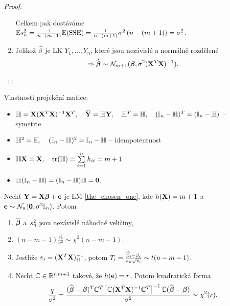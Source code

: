 \begin{proof}
\begin{enumerate}
Celkem pak dostáváme $\mathbb{E} s_n^2 = \frac{1}{n - (m + 1)} \mathbb{E} (\mathrm{SSE}) = \frac{1}{n - (m + 1)} \sigma^2\left(n - (m + 1)\right) = \sigma^2$.

\item
 Jelikož $\widehat{\beta}$ je LK $Y_1,\dots, Y_n$, které jsou nezávislé a normálně rozdělené $$\Rightarrow \widehat{\boldsymbol{\beta}} \sim \mathcal{N}_{m+1} (\boldsymbol{\beta}, \sigma^2(\mathbf{X}^T \mathbf{X})^{-1}).$$
\end{enumerate}
\end{proof}

\begin{remark}
	Vlastnosti projekční matice:
	\begin{itemize}
		\item $\mathbb{H} = \mathbf{X} (\mathbf{X}^T \mathbf{X})^{-1} \mathbf{X}^T, \quad \widehat{\mathbf{Y}} = \mathbb{H} \mathbf{Y}, \quad \mathbb{H}^T = \mathbb{H}, \quad (\mathbb{I}_{n} - \mathbb{H})^T = (\mathbb{I}_{n} - \mathbb{H})$ -- symetrie
		\item $\mathbb{H}^2 = \mathbb{H}, \quad (\mathbb{I}_{n} - \mathbb{H})^2 = \mathbb{I}_{n} - \mathbb{H}$ -- idempotentnost
		\item $\mathbb{H} \mathbf{X} = \mathbf{X}, \quad \mathrm{tr}(\mathbb{H}) = \sum\limits_{i=1}^{n} h_{ii} = m + 1$
		\item $\mathbb{H}(\mathbb{I}_{n} - \mathbb{H}) = (\mathbb{I}_{n} - \mathbb{H}) \mathbb{H} = \boldsymbol{0}$.
	\end{itemize}
\end{remark}

\begin{theorem}
	Nechť $\mathbf{Y} = \mathbf{X} \boldsymbol{\beta} + \mathbf{e}$ je LM \eqref{the_chosen_one}, kde $h(\mathbf{X}) = m + 1$ a~$\mathbf{e} \sim \mathcal{N}_n(\boldsymbol{0},\sigma^2 \mathbb{I}_{n})$. Potom
	\begin{enumerate}
		\item $\widehat{\boldsymbol{\beta}}$ a~$s_n^2$ jsou nezávislé náhodné veličiny,
		\item $(n - m - 1) \frac{s_n^2}{\sigma^2} \sim \chi^2(n - m - 1)$.
		\item Jestliže $v_i = (\mathbf{X}^T \mathbf{X})_{ii}^{-1}$, potom $T_i = \frac{\widehat{\beta}_i - \beta_i}{s_n \sqrt{v_i}} \sim t(n-m-1)$.
		\item Nechť $\mathbb{C} \in \mathbb{R}^{r,m+1}$ takové, že $h(\mathbf{e}) = r$. Potom kvadratická forma
		 $$
			\frac{q}{\sigma^2} = \frac{(\widehat{\boldsymbol{\beta}} - \boldsymbol{\beta})^T \mathbb{C}^T \left[\mathbb{C} (\mathbf{X}^T \mathbf{X})^{-1} \mathbb{C}^T \right]^{-1} \mathbb{C} (\widehat{\boldsymbol{\beta}} - \boldsymbol{\beta})}{\sigma^2} \sim \chi^2(r).
		 $$
	\end{enumerate}
\end{theorem}

